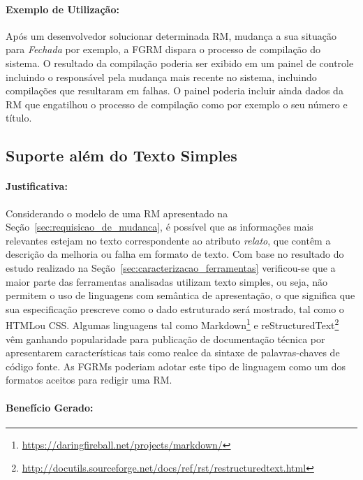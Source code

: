 \paragraph{Exemplo de Utilização:}
\label{par:exemplo_de_utilização_s05}

Após um desenvolvedor solucionar determinada RM, mudança a sua situação para
\textit{Fechada} por exemplo, a FGRM dispara o processo de compilação do
sistema. O resultado da compilação poderia ser exibido em um painel de controle
incluindo o responsável pela mudança mais recente no sistema, incluindo
compilações que resultaram em falhas. O painel poderia incluir ainda dados da RM
que engatilhou o processo de compilação como por exemplo o seu número e título.

\subsection{Suporte além do Texto Simples}
\label{sub:suporte_linguagem_marcacao}


\paragraph{Justificativa:}
\label{par:justificativa_s06}

Considerando o modelo de uma RM apresentado na
Seção~\ref{sec:requisicao_de_mudanca}, é possível que as informações mais
relevantes estejam no texto correspondente ao atributo \textit{relato}, que
contêm a descrição da melhoria ou falha em formato de texto. Com base no
resultado do estudo realizado na Seção~\ref{sec:caracterizacao_ferramentas}
verificou-se que a maior parte das ferramentas analisadas utilizam texto
simples, ou seja, não permitem o uso de linguagens com semântica de
apresentação, o que significa que sua especificação prescreve como o dado
estruturado será mostrado, tal como o HTML\@  ou CSS\@.  Algumas linguagens tal
como Markdown\footnote{\url{https://daringfireball.net/projects/markdown/}} e
reStructuredText\footnote{\url{http://docutils.sourceforge.net/docs/ref/rst/restructuredtext.html}}
vêm ganhando popularidade para publicação de documentação técnica por
apresentarem características tais como realce da sintaxe de palavras-chaves de
código fonte. As FGRMs poderiam adotar este tipo de linguagem como um dos
formatos aceitos para redigir uma RM\@.

\paragraph{Benefício Gerado:}
\label{par:papéis_afetados_s06}

